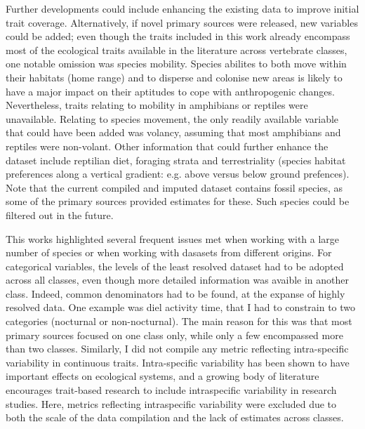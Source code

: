Further developments could include enhancing the existing data to improve initial trait coverage. Alternatively, if novel primary sources were released, new variables could be added; even though the traits included in this work already encompass most of the ecological traits available in the literature across vertebrate classes, one notable omission was species mobility. Species abilites to both move within their habitats (home range) and to disperse and colonise new areas is likely to have a major impact on their aptitudes to cope with anthropogenic changes. Nevertheless, traits relating to mobility in amphibians or reptiles were unavailable. Relating to species movement, the only readily available variable that could have been added was volancy, assuming that most amphibians and reptiles were non-volant. Other  information that could further enhance the dataset include reptilian diet, foraging strata and terrestriality (species habitat preferences along a vertical gradient: e.g. above versus below ground prefences). Note that the current compiled and imputed dataset contains fossil species, as some of the primary sources provided estimates for these. Such species could be filtered out in the future.

This works highlighted several frequent issues met when working with a large number of species or when working with dasasets from different origins. For categorical variables, the levels of the least resolved dataset had to be adopted across all classes, even though more detailed information was avaible in another class. Indeed, common denominators had to be found, at the expanse of highly resolved data. One example was diel activity time, that I had to constrain to two categories (nocturnal or non-nocturnal). The main reason for this was that most primary sources focused on one class only, while only a few encompassed more than two classes. Similarly, I did not compile any metric reflecting intra-specific variability in continuous traits. Intra-specific variability has been shown to have important effects on ecological systems, and a growing body of literature encourages trait-based research to include intraspecific variability in research studies. Here, metrics reflecting intraspecific variability were excluded due to both the scale of the data compilation and the lack of estimates across classes.

